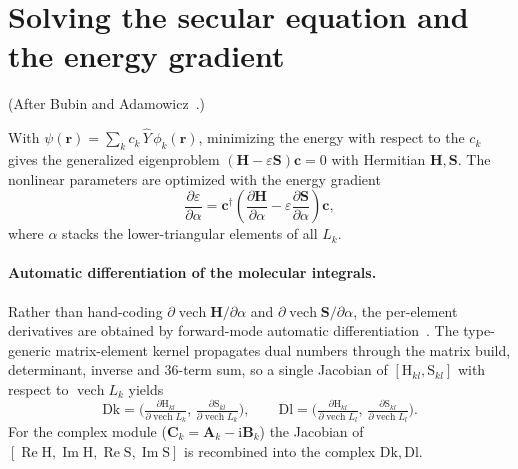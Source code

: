 \documentclass[11pt]{article}
\newcommand{\rvec}{\mathbf{r}}
\newcommand{\vech}{\operatorname{vech}}
\newcommand{\Ycal}{\hat{Y}}
\begin{document}
\section{Solving the secular equation and the energy gradient}
\label{app:secular}
(After Bubin and Adamowicz~\cite{Bubin2008,Bubin2013}.)

With $\psi(\rvec)=\sum_k c_k\,\Ycal\,\phi_k(\rvec)$, minimizing the energy with
respect to the $c_k$ gives the generalized eigenproblem
$(\mathbf{H}-\varepsilon\mathbf{S})\mathbf{c}=0$ with Hermitian
$\mathbf{H},\mathbf{S}$. The nonlinear parameters are optimized with the energy
gradient
\begin{equation}
\frac{\partial\varepsilon}{\partial\alpha}
=\mathbf{c}^{\dagger}\!\left(\frac{\partial\mathbf{H}}{\partial\alpha}
-\varepsilon\frac{\partial\mathbf{S}}{\partial\alpha}\right)\mathbf{c},
\end{equation}
where $\alpha$ stacks the lower-triangular elements of all $L_k$.

\paragraph{Automatic differentiation of the molecular integrals.}
Rather than hand-coding $\partial\vech\mathbf{H}/\partial\alpha$ and
$\partial\vech\mathbf{S}/\partial\alpha$, the per-element derivatives are
obtained by forward-mode automatic differentiation~\cite{Revels2016}. The
type-generic matrix-element kernel propagates dual numbers through the matrix
build, determinant, inverse and $36$-term sum, so a single Jacobian of
$[\mathrm{H}_{kl},\mathrm{S}_{kl}]$ with respect to $\vech L_k$ yields
\begin{equation}
\mathrm{Dk}=\Big(\tfrac{\partial \mathrm{H}_{kl}}{\partial \vech L_k},\,
\tfrac{\partial \mathrm{S}_{kl}}{\partial \vech L_k}\Big),\qquad
\mathrm{Dl}=\Big(\tfrac{\partial \mathrm{H}_{kl}}{\partial \vech L_l},\,
\tfrac{\partial \mathrm{S}_{kl}}{\partial \vech L_l}\Big).
\end{equation}
For the complex module ($\mathbf{C}_k=\mathbf{A}_k-\mathrm{i}\mathbf{B}_k$) the
Jacobian of $[\operatorname{Re}\mathrm{H},\operatorname{Im}\mathrm{H},
\operatorname{Re}\mathrm{S},\operatorname{Im}\mathrm{S}]$ is recombined into the
complex $\mathrm{Dk},\mathrm{Dl}$.
\end{document}
